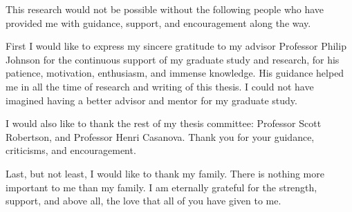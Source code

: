 
\begin{acknowledgments}
This research would not be possible without the following people who have provided me with guidance, support, and encouragement along the way.

First I would like to express my sincere gratitude to my advisor Professor Philip Johnson for the continuous support of my graduate study and research, for his patience, motivation, enthusiasm, and immense knowledge. His guidance helped me in all the time of research and writing of this thesis. I could not have imagined having a better advisor and mentor for my graduate study.

I would also like to thank the rest of my thesis committee: Professor Scott Robertson, and Professor Henri Casanova. Thank you for your guidance, criticisms, and encouragement.

Last, but not least, I would like to thank my family. There is nothing more important to me than my family. I am eternally grateful for the strength, support, and above all, the love that all of you have given to me.
\end{acknowledgments}